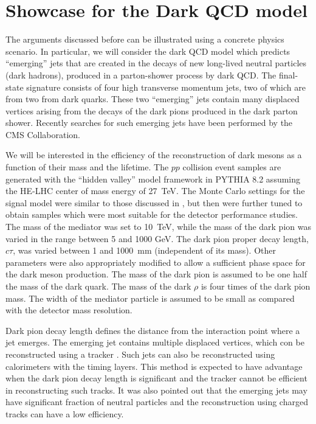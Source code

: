 \section{Showcase for the Dark QCD model}
\label{darksec}

The arguments discussed before can be illustrated using a concrete physics scenario.
In particular, we will consider the dark QCD model \cite{Bai:2013xga,Schwaller:2015gea} which predicts 
``emerging'' jets 
that are created in the decays of new long-lived neutral 
particles (dark hadrons), produced in a parton-shower process by dark QCD.
The final-state signature consists of four high transverse momentum jets, two of which 
are from two from dark quarks. These two ``emerging'' jets contain many displaced
vertices arising from the decays of the dark pions produced in the dark parton shower.
Recently searches for such emerging jets have been performed \cite{Sirunyan:2018njd} 
by the CMS Collaboration.

We will be interested in the efficiency of the reconstruction of dark mesons  as a function of their mass
and the lifetime.    
The $pp$ collision event samples  are generated with the ``hidden valley'' model framework in PYTHIA 8.2 assuming
the HE-LHC center of mass energy of 27~TeV. The Monte Carlo settings for the signal model were similar
to those discussed in  \cite{Sirunyan:2018njd}, but then were further tuned \cite{prive} to obtain samples  which were most suitable
for the detector performance studies. 
The mass of the mediator was set to 10~TeV, while the mass of the dark pion was varied in the range between 5 and 1000 GeV.
The dark pion proper decay length, $c\tau$,  was varied between 1 and 1000~mm (independent of its mass). Other parameters
were also appropriately modified to allow a sufficient phase space for the dark meson production.
The mass of the dark pion is assumed to be one half the mass of the dark quark. The mass of the dark
$\rho$ is four times of the dark pion mass. The width of the
mediator particle is assumed to be small as compared with the detector mass resolution.

Dark pion decay length defines the distance from the interaction point where a jet emerges. The  emerging jet contains multiple displaced vertices,
which con be reconstructed using a tracker  \cite{Sirunyan:2018njd}. 
Such jets can also be reconstructed using calorimeters with the timing layers. This method is expected
to have advantage when the dark pion decay length is significant and the tracker cannot be efficient in reconstructing such tracks. 
It was also pointed out \cite{Schwaller:2015gea} that the emerging jets may have significant fraction of neutral particles and the reconstruction
using charged tracks can have a low efficiency.  

